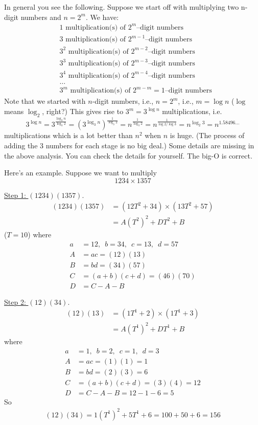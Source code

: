 In general you see the following.
Suppose we start off with multiplying two n-digit numbers
and $n = 2^m$.
We have:
\begin{align*}
&1 \text{ multiplication(s) of } 2^m\text{--digit numbers} \\
&3 \text{ multiplication(s) of } 2^{m-1}\text{--digit numbers} \\
&3^2 \text{ multiplication(s) of } 2^{m-2}\text{--digit numbers} \\
&3^3 \text{ multiplication(s) of } 2^{m-3}\text{--digit numbers} \\
&3^4 \text{ multiplication(s) of } 2^{m-4}\text{--digit numbers} \\
&\ldots \\
&3^m \text{ multiplication(s) of } 2^{m-m} = 1\text{--digit numbers}
\end{align*}
Note that we started with $n$-digit numbers, i.e., $n = 2^m$, 
i.e., $m = \log n$
($\log$ means $\log_2$, right?)
This gives rise to $3^m = 3^{\log n}$ multiplications, i.e.
\[
3^{\log n} 
= 3^\frac{\log_3 n}{\log_3 2} 
= \left(
3^{\log_3 n}
\right)^\frac{1}{\log_3 2}
= n^\frac{1}{\log_3 2}
= n^\frac{1}{\log 2/\log 3}
= n^{\log_2 3}
= n^{1.58496...}
\]
multiplications
which is a lot better than $n^2$ when $n$ is huge.
(The process of adding the 3 numbers for each stage is no big deal.)
Some details are missing in the above analysis.
You can check the details for yourself.
The big-O is correct. 

Here's an example.
Suppose we want to multiply
\[
1234 \times 1357
\]

\underline{Step 1: $(1234)(1357)$}.
\begin{align*}
(1234)(1357)
&= (12T^2 + 34) \times (13T^2 + 57) \\
&= A (T^2)^2 + D T^2 + B
\end{align*}
($T = 10$)
where
\begin{align*}
a &= 12, \,\,\, b = 34, \,\,\, c = 13, \,\,\, d = 57 \\
A &= a c = (12)(13)\\
B &= b d = (34)(57)\\
C &= (a + b) (c + d) = (46)(70)\\
D &= C - A - B
\end{align*}

\underline{Step 2: $(12)(34)$}.
\begin{align*}
(12)(13) 
&= (1T^1 + 2) \times (1T^1 + 3) \\
&= A (T^1)^2 + D T^1 + B 
\end{align*}
where
\begin{align*}
a &= 1, \,\,\, b = 2, \,\,\, c = 1, \,\,\, d = 3 \\
A &= a c = (1)(1) = 1\\
B &= b d = (2)(3) = 6\\
C &= (a + b) (c + d) = (3)(4) = 12\\
D &= C - A - B = 12 - 1 - 6 = 5
\end{align*}
So
\begin{align*}
(12)(34) = 1(T^1)^2 + 5T^1 + 6 = 100 + 50 + 6 = 156 
\end{align*}

